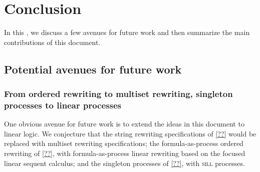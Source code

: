 \chapter{Conclusion}\label{ch:conclusion}

In this , we discuss a few avenues for future work and then summarize the main contributions of this document.

\section{Potential avenues for future work}

\subsection{From ordered rewriting to multiset rewriting, singleton processes to linear processes}

One obvious avenue for future work is to extend the ideas in this document to linear logic.
We conjecture that the string rewriting specifications of \cref{??} would be replaced with multiset rewriting specifications\autocite{??}; the formula-as-process ordered rewriting of \cref{??}, with formula-as-process linear rewriting based on the focused linear sequent calculus\autocite{??}; and the singleton processes of \cref{??}, with \textsc{sill} processes\autocite{??}.



